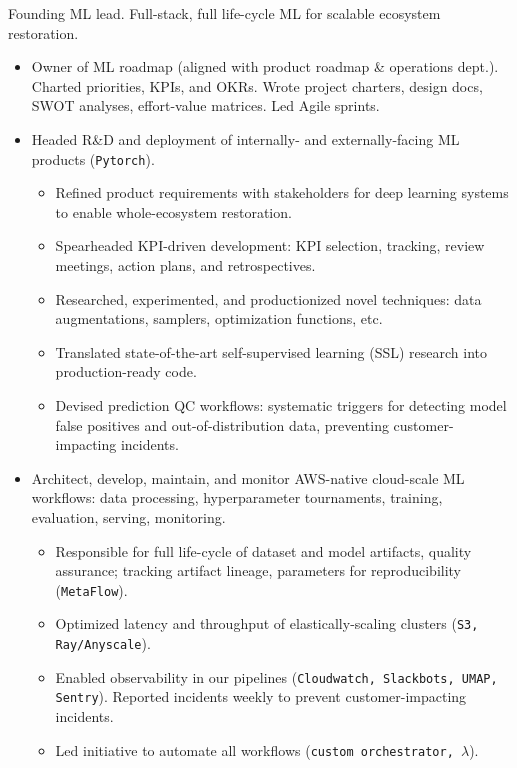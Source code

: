 \documentclass[a4paper,12pt]{article}
\begin{document}
    \vspace{-6pt} Founding ML lead. Full-stack, full life-cycle ML for scalable ecosystem restoration.
    \begin{itemize}
        \item Owner of ML roadmap (aligned with product roadmap \& operations dept.). Charted priorities, KPIs, and OKRs. Wrote project charters, design docs, SWOT analyses, effort-value matrices. Led Agile sprints.
        \item Headed R\&D and deployment of internally- and externally-facing ML products (\texttt{Pytorch}).
        \begin{itemize}
            \item Refined product requirements with stakeholders for deep learning systems to enable whole-ecosystem restoration.
            \item Spearheaded KPI-driven development: KPI selection, tracking, review meetings, action plans, and retrospectives.
            \item Researched, experimented, and productionized novel techniques: data augmentations, samplers, optimization functions, etc.
            \item Translated state-of-the-art self-supervised learning (SSL) research into production-ready code.
            \item Devised prediction QC workflows: systematic triggers for detecting model false positives and out-of-distribution data, preventing customer-impacting incidents.
        \end{itemize}
        \item Architect, develop, maintain, and monitor AWS-native cloud-scale ML workflows: data processing, hyperparameter tournaments, training, evaluation, serving, monitoring.
        \begin{itemize}
            \item Responsible for full life-cycle of dataset and model artifacts, quality assurance;
            tracking artifact lineage, parameters for reproducibility (\texttt{MetaFlow}).
            \item Optimized latency and throughput of elastically-scaling clusters (\texttt{S3, Ray/Anyscale}).
            \item Enabled observability in our pipelines (\texttt{Cloudwatch, Slackbots, UMAP, Sentry}). Reported incidents weekly to prevent customer-impacting incidents.
            \item Led initiative to automate all workflows (\texttt{custom orchestrator, $\lambda$}).

\end{itemize}
\end{itemize}
\end{document}
